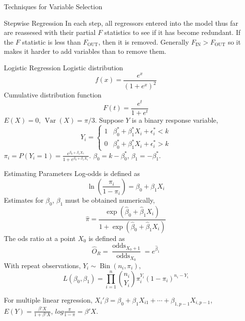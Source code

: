 \documentclass{article}
\DeclareMathOperator{\Var}{Var}
\DeclareMathOperator{\Bin}{Bin}
\DeclareMathOperator{\fin}{IN}
\DeclareMathOperator{\fout}{OUT}
\DeclareMathOperator{\odds}{odds}
\begin{document}
\begin{multicols*}{3}
\begin{blackbox}{Techniques for Variable Selection}
            \begin{pinkbox}{Stepwise Regression}
                In each step, all regressors entered into the model
                thus far are reassesed with their partial $F$ statistics to see if it has become redundant. If the $F$ statistic is less than $F_{\fout}$, then it is removed. Generally $F_{\fin} > F_{\fout}$ so it makes it harder to add variables than to remove them.
            \end{pinkbox}
            \vspace{-2ex}
        \end{blackbox}
        \begin{blackbox}{Logistic Regression}
            Logistic distribution\\[-3ex]
            \[f(x) = \frac{e^x}{(1+e^{x})^2}\]            
            Cumulative distribution function\\[-2ex]
            \[F(t) = \frac{e^t}{1+e^t}\]
            $E(X) = 0$, $\Var(X) = \pi/3$. Suppose $Y$ is a binary response variable,\\[-2ex]
            \[Y_i = \begin{cases}
                1 & \beta^*_0 + \beta^*_1X_i + \epsilon^*_i < k\\
                0 & \beta^*_0 + \beta^*_1X_i + \epsilon^*_i > k
            \end{cases}\]
            $\pi_i = P(Y_i = 1) = \frac{e^{\beta_0 + \beta_1X_1}}{1 + e^{\beta_0 + \beta_1X_1}}$. $\beta_0 = k - \beta_0^*$, $\beta_1 = -\beta_1^*$.
            \begin{bluebox}{Estimating Parameters}
                Log-odds is defined as \\[-2ex]
                \[\ln\left(\frac{\pi_i}{1-\pi_i}\right) = \beta_0 + \beta_1 X_i\]
                Estimates for $\beta_0$, $\beta_1$ must be obtained numerically, \\[-2ex]
                \[\hat{\pi} = \frac{\exp(\hat{\beta}_0 + \hat{\beta}_1X_i)}{1 + \exp(\hat{\beta}_0 + \hat{\beta}_1X_i)}\]
                The ods ratio at a point $X_0$ is defined as \\[-2ex]
                \[\hat{O}_R = \frac{\odds_{X_0+1}}{\odds_{X_0}} = e^{\hat{\beta}_1}\]
                With repeat observations, $Y_i \sim \Bin(n_i,\pi_i)$,\\[-2ex] 
                \[L(\beta_0, \beta_1) = \prod_{i=1}^n {n_i \choose Y_i} \pi_i^{Y_i}(1-\pi_i)^{n_i - Y_i}\]
            \end{bluebox}
            For multiple linear regression, $X_i'\beta = \beta_0 + \beta_1X_{i1} + \cdots + \beta_{1,p-1}X_{i,p-1}$, $E(Y) = \frac{\beta'X}{1 + \beta'X}$, $log\frac{\pi}{1-\pi} = \beta'X$.

\end{blackbox}
\end{multicols*}
\end{document}
